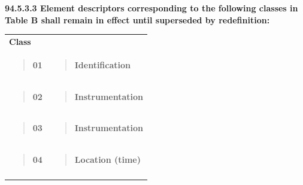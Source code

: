 \textbf{94.5.3.3 Element descriptors corresponding to the following classes in Table B shall remain in effect until superseded by redefinition:}

\begin{longtable}[]{@{}ll@{}}
\toprule
\endhead
\textbf{Class} &\tabularnewline
\begin{minipage}[t]{0.47\columnwidth}\raggedright
\begin{quote}
\textbf{01}
\end{quote}\strut
\end{minipage} & \begin{minipage}[t]{0.47\columnwidth}\raggedright
\begin{quote}
\textbf{Identification}
\end{quote}\strut
\end{minipage}\tabularnewline
\begin{minipage}[t]{0.47\columnwidth}\raggedright
\begin{quote}
\textbf{02}
\end{quote}\strut
\end{minipage} & \begin{minipage}[t]{0.47\columnwidth}\raggedright
\begin{quote}
\textbf{Instrumentation}
\end{quote}\strut
\end{minipage}\tabularnewline
\begin{minipage}[t]{0.47\columnwidth}\raggedright
\begin{quote}
\textbf{03}
\end{quote}\strut
\end{minipage} & \begin{minipage}[t]{0.47\columnwidth}\raggedright
\begin{quote}
\textbf{Instrumentation}
\end{quote}\strut
\end{minipage}\tabularnewline
\begin{minipage}[t]{0.47\columnwidth}\raggedright
\begin{quote}
\textbf{04}
\end{quote}\strut
\end{minipage} & \begin{minipage}[t]{0.47\columnwidth}\raggedright
\begin{quote}
\textbf{Location (time)}
\end{quote}\strut
\end{minipage}\tabularnewline
\begin{minipage}[t]{0.47\columnwidth}\raggedright

\end{minipage}
\end{longtable}

